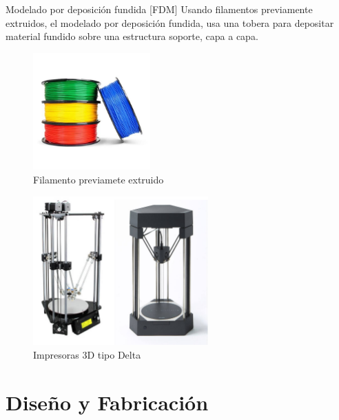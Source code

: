 \documentclass{beamer}
\begin{document}
\begin{frame}
    
    \begin{block}{Modelado por deposición fundida [FDM]}
    	Usando filamentos previamente extruidos, el modelado por deposición fundida, usa una tobera para depositar material fundido sobre una estructura soporte, capa a capa.
    \end{block}

\begin{figure}[h!]
	\centering
	\includegraphics[width=0.4\textwidth]{PLA}
	\caption{Filamento previamete extruido}
	\label{Filamento}
\end{figure}
    
\end{frame}

\begin{frame}
\begin{figure}[h!]
	\centering
	\includegraphics[width=0.6\textwidth]{maquinasFDM.png}
	\caption{Impresoras 3D tipo Delta}
	\label{Delta}
\end{figure}

\end{frame}

\section{Diseño y Fabricación}
\end{document}
